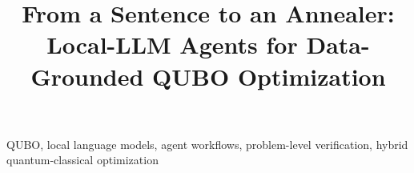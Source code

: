 \documentclass[10pt,conference,compsoc,letterpaper]{IEEEtran}
\title{From a Sentence to an Annealer: Local-LLM Agents for Data-Grounded QUBO Optimization}
\author{\IEEEauthorblockN{Chia Chen Yang}}
\begin{document}
\maketitle

\begin{IEEEkeywords}
QUBO, local language models, agent workflows, problem-level verification, hybrid quantum-classical optimization
\end{IEEEkeywords}







\end{document}
